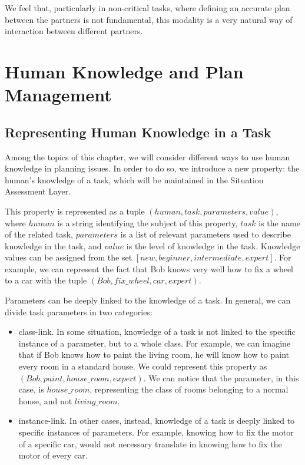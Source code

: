 We feel that, particularly in non-critical tasks, where defining an accurate plan between the partners is not
fundamental, this modality is a very natural way of
interaction between different partners.



\section{Human Knowledge and Plan Management}
\label{sec:plan_management-human_knowledge}
\subsection{Representing Human Knowledge in a Task}
Among the topics of this chapter, we will consider different ways to use human knowledge in planning issues. In order to do so, we introduce a new property: the human's knowledge of a task, which will be maintained in the Situation Assessment Layer. 

This property is represented as a tuple $(human, task, parameters, value)$, where $human$ is a string identifying the subject of this property, $task$ is the name of the related task, $parameters$ is a list of relevant parameters used to describe knowledge in the task, and $value$ is the level of knowledge in the task. Knowledge values can be assigned from the set $[new, beginner, intermediate, expert]$.  For example, we can represent the fact that Bob knows very well how to fix a wheel to a car with the tuple $(Bob, fix\_wheel, car, expert)$. 

Parameters can be deeply linked to the knowledge of a task. In general, we can divide task parameters in two categories:
\begin{itemize}
\item class-link. In some situation, knowledge of a task is not linked to the specific instance of a parameter, but to a whole class. For example, we can imagine that if Bob knows how to paint the living room, he will know how to paint every room in a standard house. We could represent this property as $(Bob, paint, house\_room, expert)$. We can notice that the parameter, in this case, is $house\_room$, representing the class of rooms belonging to a normal house, and not $living\_room$.
\item instance-link. In other cases, instead, knowledge of a task is deeply linked to specific instances of parameters. For example, knowing how to fix the motor of a specific car, would not necessary translate in knowing how to fix the motor of every car.
\end{itemize}

